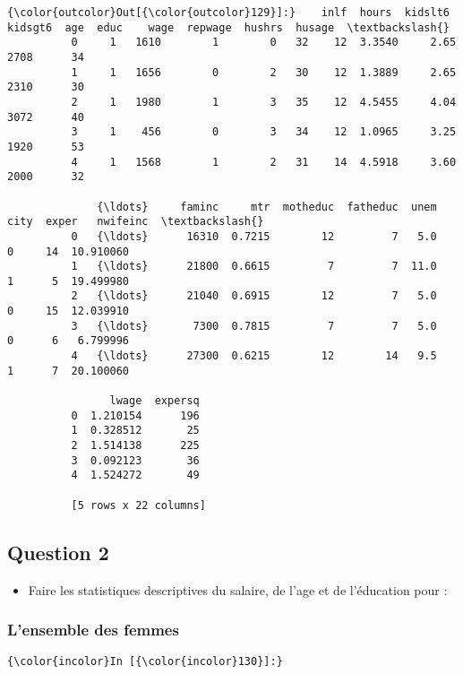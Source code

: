 \documentclass[11pt]{article}
\providecommand{\tightlist}{%
      \setlength{\itemsep}{0pt}\setlength{\parskip}{0pt}}
\begin{document}
\begin{Verbatim}[commandchars=\\\{\}]
{\color{outcolor}Out[{\color{outcolor}129}]:}    inlf  hours  kidslt6  kidsgt6  age  educ    wage  repwage  hushrs  husage  \textbackslash{}
          0     1   1610        1        0   32    12  3.3540     2.65    2708      34   
          1     1   1656        0        2   30    12  1.3889     2.65    2310      30   
          2     1   1980        1        3   35    12  4.5455     4.04    3072      40   
          3     1    456        0        3   34    12  1.0965     3.25    1920      53   
          4     1   1568        1        2   31    14  4.5918     3.60    2000      32   
          
              {\ldots}     faminc     mtr  motheduc  fatheduc  unem  city  exper   nwifeinc  \textbackslash{}
          0   {\ldots}      16310  0.7215        12         7   5.0     0     14  10.910060   
          1   {\ldots}      21800  0.6615         7         7  11.0     1      5  19.499980   
          2   {\ldots}      21040  0.6915        12         7   5.0     0     15  12.039910   
          3   {\ldots}       7300  0.7815         7         7   5.0     0      6   6.799996   
          4   {\ldots}      27300  0.6215        12        14   9.5     1      7  20.100060   
          
                lwage  expersq  
          0  1.210154      196  
          1  0.328512       25  
          2  1.514138      225  
          3  0.092123       36  
          4  1.524272       49  
          
          [5 rows x 22 columns]
\end{Verbatim}
            
    \subsection{Question 2}\label{question-2}

\begin{itemize}
\tightlist
\item
  Faire les statistiques descriptives du salaire, de l'age et de
  l'éducation pour : 
\end{itemize}

    \subsubsection{L'ensemble des femmes}\label{lensemble-des-femmes}

    \begin{Verbatim}[commandchars=\\\{\}]
{\color{incolor}In [{\color{incolor}130}]:} 
\end{Verbatim}
\end{document}
